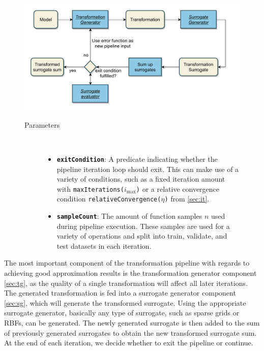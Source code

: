 \documentclass[
  a4paper,  %
  twoside,  %
  bibliography=totoc,
  headsepline,
  cleardoublepage=empty,
  parskip=half,
  draft=false
]{scrbook}
\begin{document}
\begin{mdframed}[style=style,frametitle={Transformation Pipeline}]
\begin{figure}[H]

\includegraphics[width=\textwidth]{graphics/TransformationPipeline.pdf}
\vspace{-7.5mm}

\delimit

\begin{description}
\item[Parameters] {~ \begin{itemize}[\indent{}]
\item \texttt{\textbf{exitCondition}}: A predicate indicating whether the pipeline iteration loop should exit. This can make use of a variety of conditions, such as a fixed iteration amount with \texttt{maxIterations($i_{\mathrm{max}}$)} or a relative convergence condition \texttt{relativeConvergence($\eta$)} from \cref{sec:it}.
\item \texttt{\textbf{sampleCount}}: The amount of function samples $n$ used during pipeline execution. These samples are used for a variety of operations and split into train, validate, and test datasets in each iteration.
\end{itemize}}
\end{description}

\delimit

\label{fig:tp}
\end{figure}
\end{mdframed}
%
The most important component of the transformation pipeline with regards to achieving good approximation results is the transformation generator component \cref{sec:tg}, as the quality of a single transformation will affect all later iterations.
The generated transformation is fed into a surrogate generator component \cref{sec:sg}, which will generate the transformed surrogate.
Using the appropriate surrogate generator, basically any type of surrogate, such as sparse grids or RBFs, can be generated.
The newly generated surrogate is then added to the sum of previously generated surrogates to obtain the new transformed surrogate sum.
At the end of each iteration, we decide whether to exit the pipeline or continue.
\end{document}
